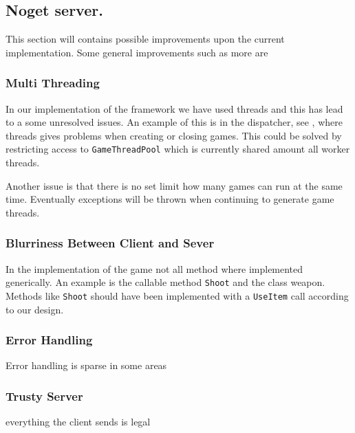 \subsection{Noget server.}
This section will contains possible improvements upon the current implementation. Some general improvements such as more are 

\subsubsection{Multi Threading}
In our implementation of the framework we have used threads and this has lead to a some unresolved issues. An example of this is in the dispatcher, see , where threads gives problems when creating or closing games. This could be solved by restricting access to \texttt{GameThreadPool} which is currently shared amount all worker threads.

Another issue is that there is no set limit how many games can run at the same time. Eventually exceptions will be thrown when continuing to generate game threads.


\subsubsection{Blurriness Between Client and Sever}
In the implementation of the game not all method where implemented generically. An example is the callable method \texttt{Shoot} and the class weapon. Methods like \texttt{Shoot} should have been implemented with a \texttt{UseItem} call according to our design.

\subsubsection{Error Handling}
Error handling is sparse in some areas 

\subsubsection{Trusty Server}
everything the client sends is legal